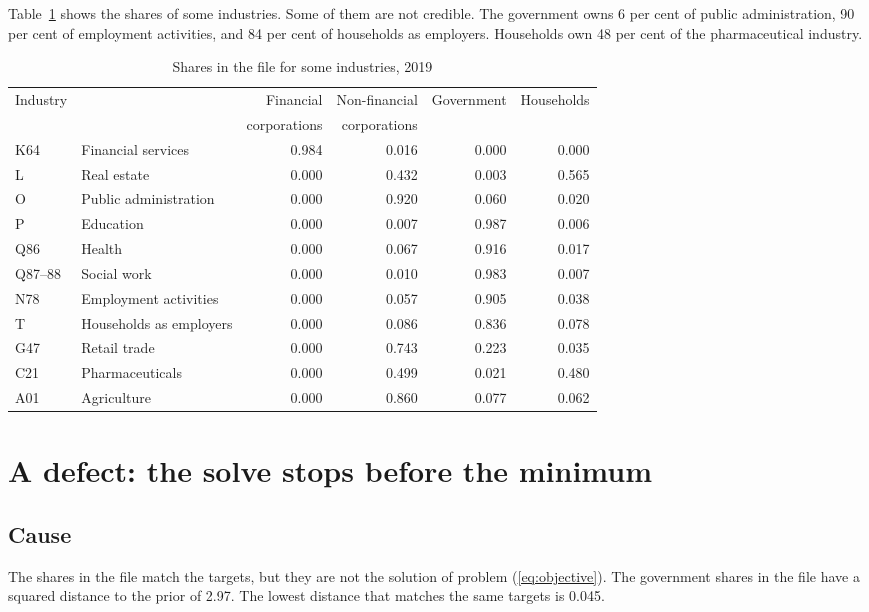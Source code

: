 \documentclass[11pt,a4paper]{article}
\begin{document}
Table~\ref{tab:shares} shows the shares of some industries. Some of them are not credible.
The government owns 6 per cent of public administration, 90 per cent of employment activities, and 84 per cent of households as employers.
Households own 48 per cent of the pharmaceutical industry.

\begin{table}[!htbp]
\centering
\small
\caption{Shares in the file for some industries, 2019}
\label{tab:shares}
\begin{tabular}{@{}llrrrr@{}}
\toprule
Industry & & Financial & Non-financial & Government & Households \\
 & & corporations & corporations & & \\
\midrule
K64 & Financial services & 0.984 & 0.016 & 0.000 & 0.000 \\
L & Real estate & 0.000 & 0.432 & 0.003 & 0.565 \\
O & Public administration & 0.000 & 0.920 & 0.060 & 0.020 \\
P & Education & 0.000 & 0.007 & 0.987 & 0.006 \\
Q86 & Health & 0.000 & 0.067 & 0.916 & 0.017 \\
Q87--88 & Social work & 0.000 & 0.010 & 0.983 & 0.007 \\
N78 & Employment activities & 0.000 & 0.057 & 0.905 & 0.038 \\
T & Households as employers & 0.000 & 0.086 & 0.836 & 0.078 \\
G47 & Retail trade & 0.000 & 0.743 & 0.223 & 0.035 \\
C21 & Pharmaceuticals & 0.000 & 0.499 & 0.021 & 0.480 \\
A01 & Agriculture & 0.000 & 0.860 & 0.077 & 0.062 \\
\bottomrule
\end{tabular}
\end{table}

\FloatBarrier
\section{A defect: the solve stops before the minimum}
\label{sec:defect}

\subsection{Cause}

The shares in the file match the targets, but they are not the solution of problem (\ref{eq:objective}).
The government shares in the file have a squared distance to the prior of 2.97. The lowest distance that matches the same targets is 0.045.
\end{document}

